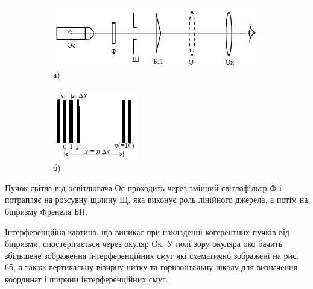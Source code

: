 \documentclass[12pt,a4paper]{article}
\begin{document}
    \begin{figure}[h!]
        \centering
        
        \begin{subfigure}[b]{0.8\textwidth}
            \centering
            \includegraphics[width=\textwidth]{6a.png} %
            \caption*{а)}
        \end{subfigure}
        
        \vspace{1em} %
        
        \begin{subfigure}[b]{0.8\textwidth}
            \centering
            \includegraphics[width=0.4\textwidth]{6b.png} %
            \caption*{б)}
        \end{subfigure}
        
        \caption{}
        \label{fig:6}

    \end{figure}

    Пучок світла від освітлювача Ос проходить через змінний світлофільтр Ф
    і потрапляє на розсувну щілину Щ, яка виконує роль лінійного джерела, а
    потім на біпризму Френеля БП.

    Інтерференційна картина, що виникає при накладенні когерентних пучків від біпризми,
    спостерігається через окуляр Ок. У полі зору окуляра око
    бачить збільшене зображення інтерференційних смуг які схематично зображені на рис. 6б,
    а також вертикальну візирну нитку та горизонтальну шкалу для визначення координат і
    ширини інтерференційних смуг.
    
\end{document}
